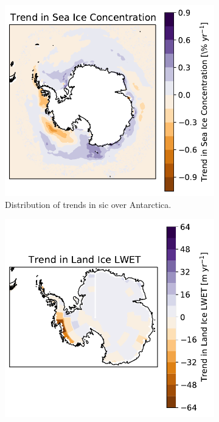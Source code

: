 \documentclass[../main.tex]{subfiles}
\begin{document}
\begin{figure}[ht!]
\centering
\begin{subfigure}[ht!]{0.49\textwidth}
\includegraphics[width=\textwidth]{images/week8/hres/trend_sic_distribution}
\caption{Distribution of trends in \gls{sic} over Antarctica.}
\end{subfigure}
\begin{subfigure}[ht!]{0.49\textwidth}
\includegraphics[width=\textwidth]{images/week8/hres/trend_lic_distribution}

\end{subfigure}
\end{figure}
\end{document}

